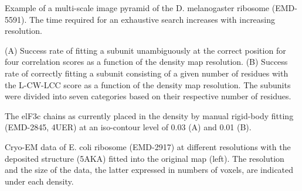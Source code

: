 \caption{}{Example of a multi-scale image pyramid of the D. melanogaster ribosome
(EMD-5591). The time required for an exhaustive search increases with
increasing resolution.}
\stopbuffer

\caption{}
{(A) Success rate of fitting a subunit unambiguously at the correct
position for four correlation scores as a function of the density map
resolution. (B) Success rate of correctly fitting a subunit consisting of a
given number of residues with the L-CW-LCC score as a function of the density
map resolution. The subunits were divided into seven categories based on their
respective number of residues.}
\stopbuffer

\caption{}
{The elF3c chains as currently placed in the density by manual rigid-body
fitting (EMD-2845, 4UER) at an iso-contour level of 0.03 (A) and 0.01 (B).}
\stopbuffer

\caption{}
{Cryo-EM data of E. coli ribosome (EMD-2917) at different resolutions with the
deposited structure (5AKA) fitted into the original map (left). The resolution
and the size of the data, the latter expressed in numbers of voxels, are
indicated under each density.}
\stopbuffer
